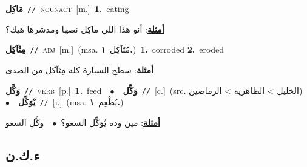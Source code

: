 \documentclass[10pt,a4paper,twoside]{article} %
\begin{document}
\begin{multicols}{2}
{\setlength\topsep{0pt}\textbf{\foreignlanguage{arabic}{مَاكِل}}\ {\color{gray}\texttt{//}\color{black}}\ \textsc{noun\textunderscore act}\ [m.]\ \textbf{1.}~eating\  \begin{flushright}\color{gray}\foreignlanguage{arabic}{\textbf{\underline{\foreignlanguage{arabic}{أمثلة}}}: أنو هذا اللي ماكِل نصها ومدشرها هيك؟}\end{flushright}\color{black}} \vspace{2mm}

{\setlength\topsep{0pt}\textbf{\foreignlanguage{arabic}{مِتْآكِل}}\ {\color{gray}\texttt{//}\color{black}}\ \textsc{adj}\ [m.]\ \color{gray}(msa. \foreignlanguage{arabic}{مُتَآكِل}~\foreignlanguage{arabic}{\textbf{١.}})\color{black}\ \textbf{1.}~corroded  \textbf{2.}~eroded\  \begin{flushright}\color{gray}\foreignlanguage{arabic}{\textbf{\underline{\foreignlanguage{arabic}{أمثلة}}}: سطح السيارة كله مِتَآكل من الصدى}\end{flushright}\color{black}} \vspace{2mm}

{\setlength\topsep{0pt}\textbf{\foreignlanguage{arabic}{وَكَّل}}\ {\color{gray}\texttt{//}\color{black}}\ \textsc{verb}\ [p.]\ \textbf{1.}~feed\ \ $\bullet$\ \ \setlength\topsep{0pt}\textbf{\foreignlanguage{arabic}{وَكِّل}}\ {\color{gray}\texttt{//}\color{black}}\ [c.]\ (src. \color{gray}\foreignlanguage{arabic}{الخليل > الظاهرية > الرماضين}\color{black})\ \ $\bullet$\ \ \setlength\topsep{0pt}\textbf{\foreignlanguage{arabic}{يْوَكِّل}}\ {\color{gray}\texttt{//}\color{black}}\ [i.]\ \color{gray}(msa. \foreignlanguage{arabic}{يُطْعِم}~\foreignlanguage{arabic}{\textbf{١.}})\color{black}\  \begin{flushright}\color{gray}\foreignlanguage{arabic}{\textbf{\underline{\foreignlanguage{arabic}{أمثلة}}}: مين وده يُوَكِّل السعو؟\ $\bullet$\ \  وكَّل السعو}\end{flushright}\color{black}} \vspace{2mm}

\vspace{-3mm}
\subsection*{\color{blue}\foreignlanguage{arabic}{ء.ك.ن}\color{blue}{ (ntws)}} 


\end{multicols}
\end{document}

